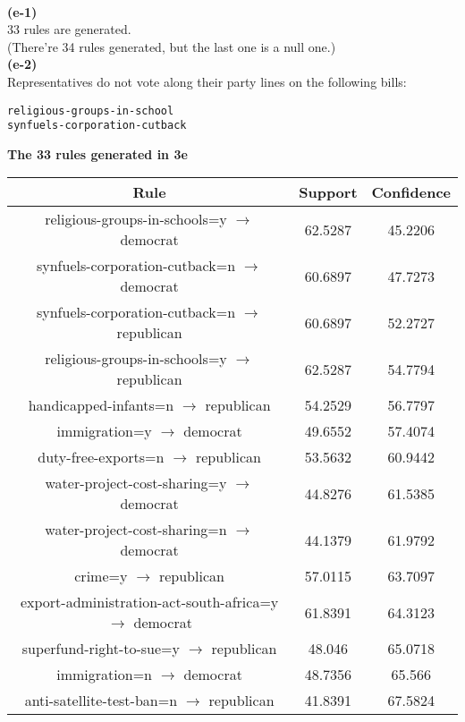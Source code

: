 \documentclass[11pt]{scrartcl}
\begin{document}
\ \   \\
\textbf{(e-1)}\\
33 rules are generated.\\
(There're 34 rules generated, but the last one is a null one.)\\
\textbf{(e-2)}\\
Representatives do not vote along their party lines on the following bills:\\
\begin{lstlisting}
religious-groups-in-school
synfuels-corporation-cutback
\end{lstlisting}
\begin{center}
	\textbf{The 33 rules generated in 3e}\\
\end{center}
\begin{tabular}{|c|c|c|}
	\hline
	Rule & Support & Confidence\\ \hline
	religious-groups-in-schools=y $\rightarrow$ democrat & 62.5287 & 45.2206\\ \hline
	synfuels-corporation-cutback=n $\rightarrow$ democrat & 60.6897 & 47.7273\\ \hline
	synfuels-corporation-cutback=n $\rightarrow$ republican & 60.6897 & 52.2727\\ \hline
	religious-groups-in-schools=y $\rightarrow$ republican & 62.5287 & 54.7794\\ \hline
	handicapped-infants=n $\rightarrow$ republican & 54.2529 & 56.7797\\ \hline
	immigration=y $\rightarrow$ democrat & 49.6552 & 57.4074\\ \hline
	duty-free-exports=n $\rightarrow$ republican & 53.5632 & 60.9442\\ \hline
	water-project-cost-sharing=y $\rightarrow$ democrat & 44.8276 & 61.5385\\ \hline
	water-project-cost-sharing=n $\rightarrow$ democrat & 44.1379 & 61.9792\\ \hline
	crime=y $\rightarrow$ republican & 57.0115 & 63.7097\\ \hline
	export-administration-act-south-africa=y $\rightarrow$ democrat & 61.8391 & 64.3123\\ \hline
	superfund-right-to-sue=y $\rightarrow$ republican & 48.046 & 65.0718\\ \hline
	immigration=n $\rightarrow$ democrat & 48.7356 & 65.566\\ \hline
	anti-satellite-test-ban=n $\rightarrow$ republican & 41.8391 & 67.5824\\ \hline

\end{tabular}
\end{document}
